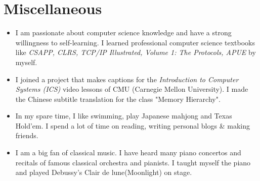 \documentclass{resume}
\begin{document}
\section{Miscellaneous}
\begin{itemize}[parsep=0.5ex]
  \item I am passionate about computer science knowledge and have a strong willingness to self-learning. I learned professional computer science textbooks like \textit{CSAPP, CLRS, TCP/IP Illustrated, Volume 1: The Protocols, APUE} by myself.
  \item I joined a project that makes captions for the \textit{Introduction to Computer Systems (ICS)} video lessons of CMU (Carnegie Mellon University). I made the Chinese subtitle translation for the class "Memory Hierarchy".
  \item In my spare time, I like swimming, play Japanese mahjong and Texas Hold'em. I spend a lot of time on reading, writing personal blogs \& making friends.
  \item I am a big fan of classical music. I have heard many piano concertos and recitals of famous classical orchestra and pianists. I taught myself the piano and played Debussy's Clair de lune(Moonlight) on stage.
\end{itemize}

%
%
\end{document}
